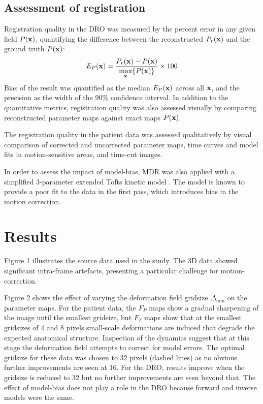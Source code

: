 \documentclass[num-refs]{wiley-article}
\newcommand{\x}{{\bf x}}
\begin{document}
\subsection{Assessment of registration}

Registration quality in the DRO was measured by the percent error in any given field $P(\x)$, quantifying the difference between the reconstructed $P_r(\x)$ and the ground truth $P(\x)$:
\begin{equation}
E_P(\x) =  \frac{P_r(\x) -P(\x)}{\underset{\x} \max \{P(\x)\}} \times 100
\end{equation}
Bias of the result was quantified as the median $E_P(\x)$ across all $\x$, and the precision as the width of the 90\% confidence interval. In addition to the quantitative metrics, registration quality was also assessed visually by comparing reconstructed parameter maps against exact maps $P(\x)$. 

The registration quality in the patient data was assessed qualitatively by visual comparison of corrected and uncorrected parameter maps, time curves and model fits in motion-sensitive areas, and time-cut images.

In order to assess the impact of model-bias, MDR was also applied with a simplified 3-parameter extended Tofts kinetic model \cite{Tofts1999}. The model is known to provide a poor fit to the data in the first pass, which introduces bias in the motion correction.

\section{Results}

Figure 1 illustrates the source data used in the study. The 3D data showed significant intra-frame artefacts, presenting a particular challenge for motion-correction.

Figure 2 shows the effect of varying the deformation field gridsize $\Delta_\textrm{min}$ on the parameter maps. For the patient data, the $F_P$ maps show a gradual sharpening of the image until the smallest gridsize, but $F_T$ maps show that at the smallest gridsizes of $4$ and $8$ pixels small-scale deformations are induced that degrade the expected anatomical structure. Inspection of the dynamics suggest that at this stage the deformation field attempts to correct for model errors. The optimal gridsize for these data was chosen to 32 pixels (dashed lines) as no obvious further improvements are seen at 16. For the DRO, results improve when the gridsize is reduced to 32 but no further improvements are seen beyond that. The effect of model-bias does not play a role in the DRO because forward and inverse models were the same. 
\end{document}
